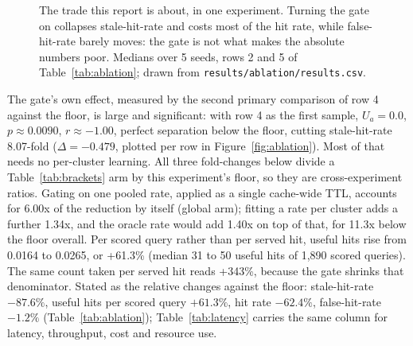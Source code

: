 \documentclass[10pt]{article}
\begin{document}
\begin{figure}[H]
\centering
{}
\caption{The trade this report is about, in one experiment. Turning the gate on collapses
stale-hit-rate and costs most of the hit rate, while false-hit-rate barely moves: the gate is
not what makes the absolute numbers poor. Medians over 5 seeds, rows 2 and 5 of
Table~\ref{tab:ablation}; drawn from \texttt{results/ablation/results.csv}.}
\label{fig:coretradeoff}
\end{figure}

The gate's own effect, measured by the second primary comparison of row 4 against the
floor, is large and significant: with row 4 as the first sample, $U_a = 0.0$, $p \approx
0.0090$, $r \approx -1.00$, perfect separation below the floor, cutting stale-hit-rate
8.07-fold ($\Delta = -0.479$, plotted per row in Figure~\ref{fig:ablation}). Most of that
needs no per-cluster learning. All three fold-changes below divide a Table~\ref{tab:brackets}
arm by this experiment's floor, so they are cross-experiment ratios. Gating on one pooled
rate, applied as a single cache-wide TTL, accounts for 6.00x of the reduction by itself
(global arm); fitting a rate per cluster adds a further 1.34x, and the oracle rate would add
1.40x on top of that, for 11.3x below the floor overall. Per scored query rather than per served hit, useful
hits rise from 0.0164 to 0.0265, or +61.3\% (median 31 to 50 useful hits of 1{,}890
scored queries). The same count taken per served hit reads
+343\%, because the gate shrinks that denominator. Stated as the relative changes against
the floor: stale-hit-rate $-87.6\%$, useful hits per scored query $+61.3\%$, hit rate
$-62.4\%$, false-hit-rate $-1.2\%$ (Table~\ref{tab:ablation});
Table~\ref{tab:latency} carries the same column for latency, throughput, cost and resource
use.
\end{document}
